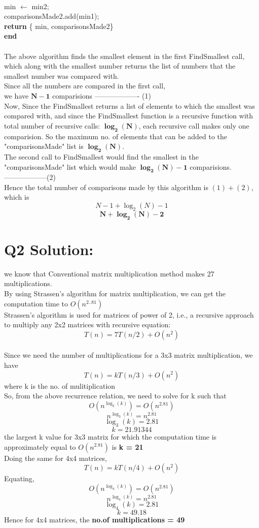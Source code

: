 \documentclass[12pt, a4paper]{article}
\newcommand\tab[1][1cm]{\hspace*{#1}}
\begin{document}
\\\tab \tab min $\gets$ min2;
\\\tab \tab comparisonsMade2.add(min1);
\\\tab \tab \textbf{return} \{ min, comparisonsMade2\}
\\\textbf{end}
\\
\\The above algorithm finds the smallest element in the first FindSmallest call, which along with the smallest number returns the list of numbers that the smallest number was compared with. 
\\Since all the numbers are compared in the first call, \\we have $\bm{N-1}$ comparisions ------------------- (1)
\\Now, Since the FindSmallest returns a list of elements to which the smallest was compared with, and since the FindSmallest function is a recursive function with total number of recursive calls: $\bm{ \log_{2}(N)} $, each recursive call makes only one comparision. So the maximum no. of elements that can be added to the "comparisonsMade" list is $\bm{ \log_{2}(N)} $.
\\The second call to FindSmallest would find the smallest in the "comparisonsMade" list which would make $\bm{ \log_{2}(N) - 1} $ comparisions. ------------------(2)
\\Hence the total number of comparisons made by this algorithm is $(1) + (2)$, which is $$ {N-1 + \log_{2}(N) - 1} $$ $$ \bm{N + \log_{2}(N) - 2} $$




\section*{Q2 Solution:}
we know that Conventional matrix multiplication method makes 27 multiplications.
\\By using Strassen's algorithm for matrix multiplication, we can get the computation time to   $O(n^{2..81})$
\\Strassen's algorithm is used for matrices of power of 2, i.e., a recursive approach to multiply any 2x2 matrices with recursive equation: $$ T(n) = 7 T(n/2) + O(n^{2}) $$ 
\\Since we need the number of multiplications for a 3x3 matrix multiplication, we have  $$ T(n) = k T(n/3) + O(n^{2}) $$ where k is the no. of mulitiplication
\\So, from the above recurrence relation, we need to solve for k such that $$O(n^{\log_{3} (k)}) = O(n^{2.81})$$
$$n^{\log_{3} (k)} = n^{2.81}$$
$$\log_{3} (k) =2.81$$
$$k=21.91344$$
the largest k value for 3x3 matrix for which the computation time is approximately equal to $O(n^{2.81})$ is \textbf{k = 21}
\\Doing the same for 4x4 matrices, $$ T(n) = k T(n/4) + O(n^{2}) $$ 
Equating,
 $$O(n^{\log_{4} (k)}) = O(n^{2.81})$$
$$n^{\log_{4} (k)} = n^{2.81}$$
$$\log_{4} (k) =2.81$$
$$k=49.18$$
Hence for 4x4 matrices, the \textbf{no.of multiplications = 49}
\end{document}
